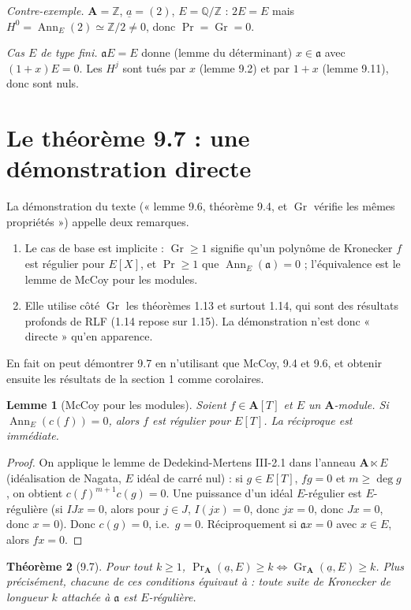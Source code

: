 \documentclass[11pt]{amsart}
\newtheorem{theorem}{Théorème}
\newtheorem{lemma}[theorem]{Lemme}
\theoremstyle{definition}
\theoremstyle{remark}
\DeclareMathOperator{\Ann}{Ann}
\DeclareMathOperator{\Gr}{Gr}
\renewcommand{\Pr}{\operatorname{Pr}}
\newcommand{\A}{\mathbf{A}}
\newcommand{\ua}{\underline{a}}
\newcommand{\fa}{\mathfrak{a}}
\begin{document}
\emph{Contre-exemple.} $\A=\mathbb Z$, $\ua=(2)$, $E=\mathbb Q/\mathbb Z$ :
$2E=E$ mais $H^0=\Ann_E(2)\simeq\mathbb Z/2\ne0$, donc $\Pr=\Gr=0$.

\emph{Cas $E$ de type fini.} $\fa E=E$ donne (lemme du déterminant)
$x\in\fa$ avec $(1+x)E=0$. Les $H^j$ sont tués par $x$ (lemme 9.2) et par
$1+x$ (lemme 9.11), donc sont nuls.

\section{Le théorème 9.7 : une démonstration directe}

La démonstration du texte (« lemme 9.6, théorème 9.4, et $\Gr$ vérifie les
mêmes propriétés ») appelle deux remarques.
\begin{enumerate}
\item Le cas de base est implicite : $\Gr\ge1$ signifie qu'un polynôme de
  Kronecker $f$ est régulier pour $E[X]$, et $\Pr\ge1$ que
  $\Ann_E(\fa)=0$ ; l'équivalence est le lemme de McCoy pour les modules.
\item Elle utilise côté $\Gr$ les théorèmes 1.13 et surtout 1.14, qui sont
  des résultats profonds de RLF (1.14 repose sur 1.15). La démonstration
  n'est donc « directe » qu'en apparence.
\end{enumerate}
En fait on peut démontrer 9.7 en n'utilisant que McCoy, 9.4 et 9.6, et
obtenir ensuite les résultats de la section 1 comme corolaires.

\begin{lemma}[McCoy pour les modules]\label{mccoy}
Soient $f\in\A[T]$ et $E$ un $\A$-module. Si $\Ann_E(c(f))=0$, alors $f$
est régulier pour $E[T]$. La réciproque est immédiate.
\end{lemma}
\begin{proof}
On applique le lemme de Dedekind-Mertens III-2.1 dans l'anneau
$\A\ltimes E$ (idéalisation de Nagata, $E$ idéal de carré nul) : si
$g\in E[T]$, $fg=0$ et $m\ge\deg g$, on obtient $c(f)^{m+1}c(g)=0$. Une
puissance d'un idéal $E$-régulier est $E$-régulière (si $IJx=0$, alors
pour $j\in J$, $I(jx)=0$, donc $jx=0$, donc $Jx=0$, donc $x=0$). Donc
$c(g)=0$, i.e.\ $g=0$. Réciproquement si $\fa x=0$ avec $x\in E$, alors
$fx=0$.
\end{proof}

\begin{theorem}[9.7]
Pour tout $k\ge1$, $\Pr_\A(\ua,E)\ge k\iff\Gr_\A(\ua,E)\ge k$. Plus
précisément, chacune de ces conditions équivaut à : \emph{toute} suite de
Kronecker de longueur $k$ attachée à $\fa$ est $E$-régulière.
\end{theorem}
\end{document}
